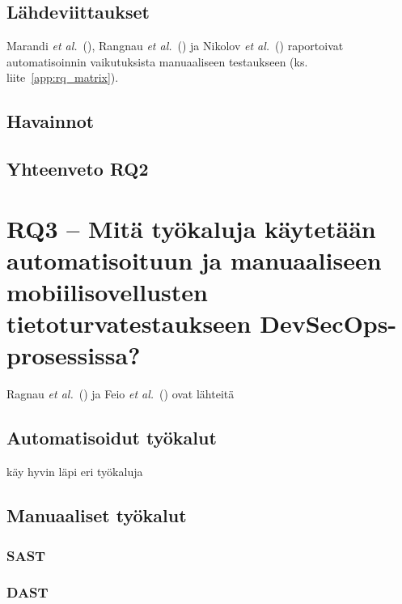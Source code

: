 \documentclass[bscthesis,finnish,oneside,biblatex]{uefcsthesis}
\begin{document}
\subsection{Lähdeviittaukset}
Marandi \emph{et al.}\ (\citeyear{marandi2023_ias}),
Rangnau \emph{et al.}\ (\citeyear{putra2022_devsecops}) ja
Nikolov \emph{et al.}\ (\citeyear{rangnau2020_cst}) raportoivat automatisoinnin
vaikutuksista manuaaliseen testaukseen (ks. liite~\ref{app:rq_matrix}).

\subsection{Havainnot}

\subsection{Yhteenveto RQ2}

\section{RQ3 – Mitä työkaluja käytetään automatisoituun ja manuaaliseen mobiilisovellusten tietoturvatestaukseen DevSecOps-prosessissa?}
\label{sec:rq3}

Ragnau \emph{et al.}\ (\citeyear{rangnau2020_cst}) ja
Feio \emph{et al.}\ (\citeyear{feio2024_empirical}) ovat lähteitä

\subsection{Automatisoidut työkalut}

\cite{feio2024_empirical} käy hyvin läpi eri työkaluja

\subsection{Manuaaliset työkalut}

\subsubsection{SAST}

\subsubsection{DAST}
\end{document}

